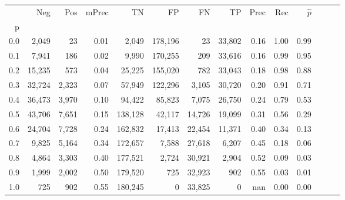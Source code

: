\begin{tabular}{rrrrrrrrrrrrrr}
\toprule
{} &     Neg &    Pos & mPrec &       TN &       FP &      FN &      TP &  Prec &   Rec & $\hat{p}$ \\
p   &         &        &       &          &          &         &         &       &       &           \\
\midrule
0.0 &   2,049 &     23 &  0.01 &    2,049 &  178,196 &      23 &  33,802 &  0.16 &  1.00 &      0.99 \\
0.1 &   7,941 &    186 &  0.02 &    9,990 &  170,255 &     209 &  33,616 &  0.16 &  0.99 &      0.95 \\
0.2 &  15,235 &    573 &  0.04 &   25,225 &  155,020 &     782 &  33,043 &  0.18 &  0.98 &      0.88 \\
0.3 &  32,724 &  2,323 &  0.07 &   57,949 &  122,296 &   3,105 &  30,720 &  0.20 &  0.91 &      0.71 \\
0.4 &  36,473 &  3,970 &  0.10 &   94,422 &   85,823 &   7,075 &  26,750 &  0.24 &  0.79 &      0.53 \\
0.5 &  43,706 &  7,651 &  0.15 &  138,128 &   42,117 &  14,726 &  19,099 &  0.31 &  0.56 &      0.29 \\
0.6 &  24,704 &  7,728 &  0.24 &  162,832 &   17,413 &  22,454 &  11,371 &  0.40 &  0.34 &      0.13 \\
0.7 &   9,825 &  5,164 &  0.34 &  172,657 &    7,588 &  27,618 &   6,207 &  0.45 &  0.18 &      0.06 \\
0.8 &   4,864 &  3,303 &  0.40 &  177,521 &    2,724 &  30,921 &   2,904 &  0.52 &  0.09 &      0.03 \\
0.9 &   1,999 &  2,002 &  0.50 &  179,520 &      725 &  32,923 &     902 &  0.55 &  0.03 &      0.01 \\
1.0 &     725 &    902 &  0.55 &  180,245 &        0 &  33,825 &       0 &   nan &  0.00 &      0.00 \\
\bottomrule
\end{tabular}
